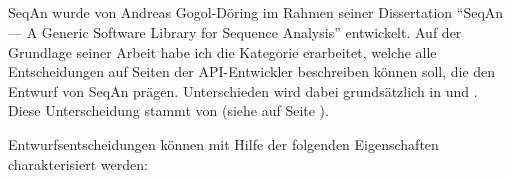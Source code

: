 \subsection[Entwurfsentscheidungen]{}
\label{sec:gt-entwurfsentscheidungen}

SeqAn wurde von Andreas Gogol-Döring im Rahmen seiner Dissertation ``SeqAn --- A Generic Software Library for Sequence Analysis'' \citep{GogolDoring:2009vz} entwickelt. Auf der Grundlage seiner Arbeit habe ich die Kategorie  erarbeitet, welche alle Entscheidungen auf Seiten der API-Entwickler beschreiben können soll, die den Entwurf von SeqAn prägen. Unterschieden wird dabei grundsätzlich in  und . Diese Unterscheidung stammt von \cite{Stylos:2007ip} (siehe  auf Seite \pageref{fig:APIDesignDecisions}).

Entwurfsentscheidungen können mit Hilfe der folgenden Eigenschaften charakterisiert werden:

